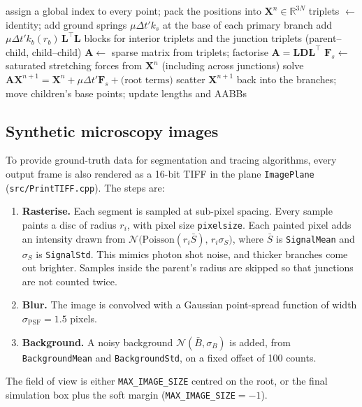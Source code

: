 \documentclass[11pt,a4paper]{article}
\newcommand{\code}[1]{\texttt{#1}}
\newcommand{\vect}[1]{\bm{#1}}
\begin{document}
\begin{algorithm}[!htbp]
\caption{Semi-implicit mechanics update (\code{updatePosition\_ImplicitGlobal})}\label{alg:mech}
\begin{algorithmic}[1]
\State assign a global index to every point; pack the positions into $\vect X^n\in\mathbb R^{3N}$
\State triplets $\gets$ identity; add ground springs $\mu\Delta t'k_s$ at the base of each primary branch
   \State add $\mu\Delta t' k_b(r_b)\,\mathbf L^\top\mathbf L$ blocks for interior triplets and the junction triplets (parent--child, child--child)
\EndFor
\State $\mathbf A\gets$ sparse matrix from triplets; factorise $\mathbf A=\mathbf{LDL}^\top$
\State $\vect F_s\gets$ saturated stretching forces from $\vect X^n$ (including across junctions)
\State solve $\mathbf A\vect X^{n+1}=\vect X^n+\mu\Delta t'\vect F_s+\text{(root terms)}$
\State scatter $\vect X^{n+1}$ back into the branches; move children's base points; update lengths and AABBs
\end{algorithmic}
\end{algorithm}

\FloatBarrier
\subsection{Synthetic microscopy images}\label{sec:tiff}
To provide ground-truth data for segmentation and tracing algorithms, every output frame is also rendered as a 16-bit TIFF in the plane \code{ImagePlane} (\code{src/PrintTIFF.cpp}). The steps are:
\begin{enumerate}
  \item \textbf{Rasterise.} Each segment is sampled at sub-pixel spacing. Every sample paints a disc of radius $r_i$, with pixel size \code{pixelsize}. Each painted pixel adds an intensity drawn from $\mathcal N\big(\text{Poisson}(r_i\bar S),\,r_i\sigma_S\big)$, where $\bar S$ is \code{SignalMean} and $\sigma_S$ is \code{SignalStd}. This mimics photon shot noise, and thicker branches come out brighter. Samples inside the parent's radius are skipped so that junctions are not counted twice.
  \item \textbf{Blur.} The image is convolved with a Gaussian point-spread function of width $\sigma_\text{PSF}=1.5$ pixels.
  \item \textbf{Background.} A noisy background $\mathcal N(\bar B,\sigma_B)$ is added, from \code{BackgroundMean} and \code{BackgroundStd}, on a fixed offset of 100 counts.
\end{enumerate}
The field of view is either \code{MAX\_IMAGE\_SIZE} centred on the root, or the final simulation box plus the soft margin (\code{MAX\_IMAGE\_SIZE}$=-1$).
\end{document}
